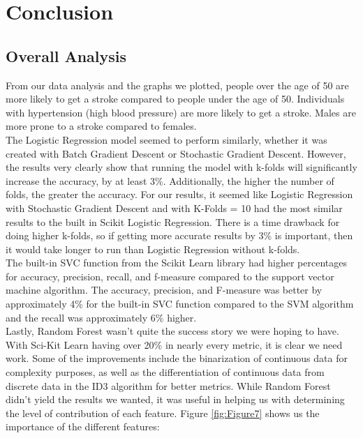\section{Conclusion}
\label{sec:conclusion}

\subsection{Overall Analysis}
\label{sec:conclusion: Overall Analysis}
From our data analysis and the graphs we plotted, people over the age of 50 are more likely to get a stroke compared to people under the age of 50. Individuals with hypertension (high blood pressure) are more likely to get a stroke. Males are more prone to a stroke compared to females.\\

\noindent The Logistic Regression model seemed to perform similarly, whether it was created with Batch Gradient Descent or Stochastic Gradient Descent. However, the results very clearly show that running the model with k-folds will significantly increase the accuracy, by at least 3\%. Additionally, the higher the number of folds, the greater the accuracy. For our results, it seemed like Logistic Regression with Stochastic Gradient Descent and with K-Folds = 10 had the most similar results to the built in Scikit Logistic Regression. There is a time drawback for doing higher k-folds, so if getting more accurate results by 3\% is important, then it would take longer to run than Logistic Regression without k-folds.\\

\noindent The built-in SVC function from the Scikit Learn library had higher percentages for accuracy, precision, recall, and f-measure compared to the support vector machine algorithm. The accuracy, precision, and F-measure was better by approximately 4\% for the built-in SVC function compared to the SVM algorithm and the recall was approximately 6\% higher.\\

\noindent Lastly, Random Forest wasn't quite the success story we were hoping to have. With Sci-Kit Learn having over 20\% in nearly every metric, it is clear we need work. Some of the improvements include the binarization of continuous data for complexity purposes, as well as the differentiation of continuous data from discrete data in the ID3 algorithm for better metrics. While Random Forest didn't yield the results we wanted, it was useful in helping us with determining the level of contribution of each feature. Figure \ref{fig:Figure7} shows us the importance of the different features:

